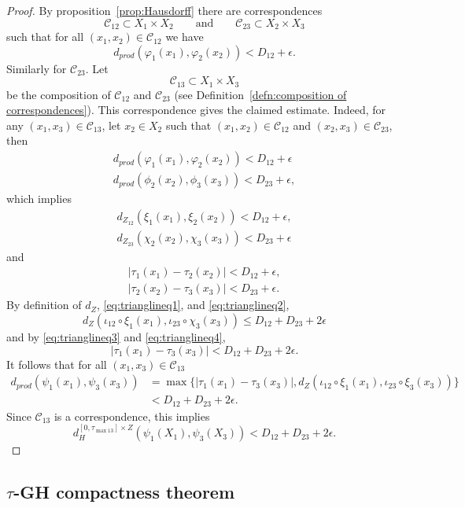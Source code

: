 \documentclass[a4paper,12pt,reqno]{amsart}
\theoremstyle{plain}
\newcommand{\be}{\begin{equation}}
\newcommand{\ee}{\end{equation}}
\begin{document}
\begin{proof}
By proposition~\ref{prop:Hausdorff}  
there are correspondences
\be
\mathcal C_{12} \subset X_1\times X_2 \qquad \text{and}\qquad \mathcal C_{23} \subset X_2\times X_3 
\ee
such that 
for all $(x_1, x_2) \in \mathcal{C}_{12}$
we have
\be
d_{prod}(\varphi_1(x_1),
\varphi_2(x_2))<D_{12}+\epsilon.
\ee
Similarly for ${\mathcal C_{23}}$. 
Let
\be
{\mathcal C_{13}} \subset X_1\times X_3
\ee
be the composition of $\mathcal{C}_{12}$ and $\mathcal{C}_{23}$ (see Definition~\ref{defn:composition of correspondences}). 
This correspondence gives the claimed estimate.  Indeed, for any $(x_1,x_3)\in \mathcal{C}_{13}$, let $x_2 \in X_2$ such that 
$(x_1, x_2) \in {\mathcal C_{12}}$ and 
$(x_2, x_3) \in {\mathcal C_{23}}$, then 
\begin{align*}
d_{prod}(\varphi_1(x_1),\varphi_2(x_2))<D_{12}+\epsilon\\
d_{prod}(\phi_2(x_2),\phi_3(x_3))<D_{23}+\epsilon,
\end{align*}
which implies
\begin{align}
d_{Z_{12}}(\xi_1(x_1),\xi_2(x_2)) < D_{12}+\epsilon, \label{eq:trianglineq1}\\
d_{Z_{23}}(\chi_2(x_2),\chi_3(x_3)) < D_{23}+\epsilon \label{eq:trianglineq2}
\end{align}
and
\begin{align}
|\tau_1(x_1)-\tau_2(x_2)| < D_{12}+\epsilon, \label{eq:trianglineq3}\\
|\tau_2(x_2)-\tau_3(x_3)| < D_{23}+\epsilon. \label{eq:trianglineq4}
\end{align}
By definition of $d_Z$, \eqref{eq:trianglineq1}, and \eqref{eq:trianglineq2},
\[
d_Z(\iota_{12}\circ\xi_1(x_1),\iota_{23}\circ\chi_3(x_3)) \leq D_{12} + D_{23} + 2\epsilon
\]
and by \eqref{eq:trianglineq3} and \eqref{eq:trianglineq4},
\[
|\tau_1(x_1)-\tau_3(x_3)| < D_{12} + D_{23} + 2\epsilon.
\]
It follows that for all $(x_1, x_3) \in \mathcal{C}_{13}$
\begin{align*}
d_{prod}(\psi_1(x_1),\psi_3(x_3)) &= \max\{|\tau_1(x_1)-\tau_3(x_3)|,d_Z(\iota_{12}\circ \xi_1(x_1),\iota_{23}\circ \xi_3(x_3))\}\\
&< D_{12} + D_{23} + 2\epsilon.
\end{align*}
Since $\mathcal{C}_{13}$ is a correspondence, this implies \be
d_{H}^{[0, \tau_{\max 13}]\times Z} ( \psi_1(X_1), \psi_3(X_3)) < D_{12}+ D_{23}+ 2\epsilon.
\ee
\end{proof}



\subsection{{$\tau$-GH} compactness theorem}
\end{document}
